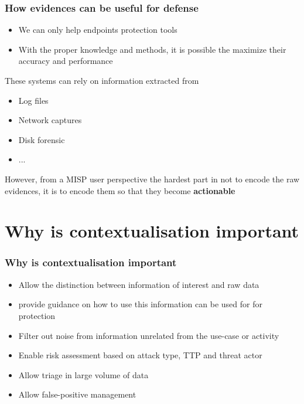 \begin{frame}
    \frametitle{How evidences can be useful for defense}
    \begin{itemize}
        \item We can only help endpoints protection tools
        \item With the proper knowledge and methods, it is possible the maximize their accuracy and performance
    \end{itemize}

    These systems can rely on information extracted from
    \begin{itemize}
        \item Log files
        \item Network captures
        \item Disk forensic
        \item ...
    \end{itemize}
    
    However, from a MISP user perspective the hardest part in not to encode the raw evidences, it is to encode them so that they become \textbf{actionable}
\end{frame}

\section{Why is contextualisation important}
\begin{frame}
    \frametitle{Why is contextualisation important}
    \begin{itemize}
        \item Allow the distinction between information of interest and raw data
        \item provide guidance on how to use this information can be used for for protection
        \item Filter out noise from information unrelated from the use-case or activity
        \item Enable risk assessment based on attack type, TTP and threat actor
        \item Allow triage in large volume of data
        \item Allow false-positive management
    \end{itemize}

\end{frame}

